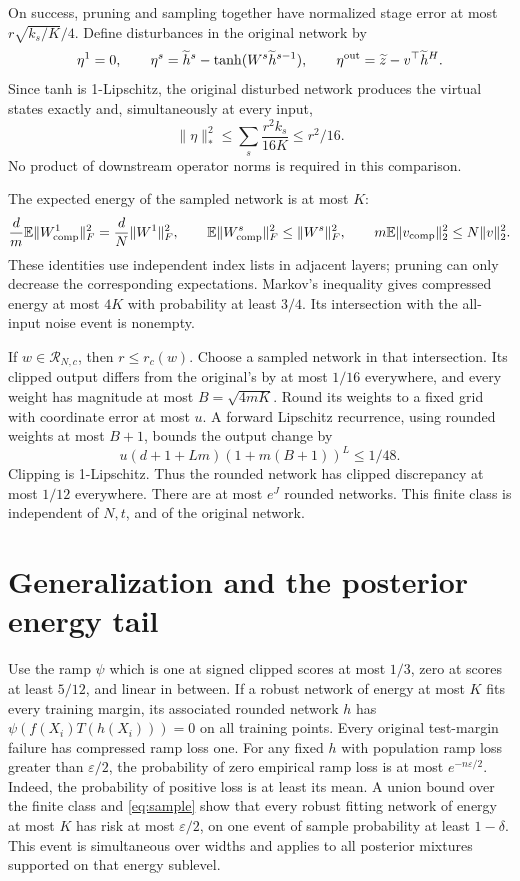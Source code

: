 \documentclass[11pt]{article}
\begin{document}
On success, pruning and sampling together have normalized stage error at
most $r\sqrt{k_s/K}/4$. Define disturbances in the original network by
\[
 \eta^1=0,\qquad
 \eta^s=\widetilde h^s-\tanh(W^s\widetilde h^{s-1}),\qquad
 \eta^{\rm out}=\widetilde z-v^\top\widetilde h^H.
\]
Since tanh is 1-Lipschitz, the original disturbed network produces the
virtual states exactly and, simultaneously at every input,
\[
 \|\eta\|_*^2\le\sum_s\frac{r^2k_s}{16K}\le r^2/16.
\]
No product of downstream operator norms is required in this comparison.

The expected energy of the sampled network is at most $K$:
\[
 \frac dm\mathbb E\|W^1_{\rm comp}\|_F^2
   =\frac dN\|W^1\|_F^2,\qquad
 \mathbb E\|W^s_{\rm comp}\|_F^2\le\|W^s\|_F^2,\qquad
 m\mathbb E\|v_{\rm comp}\|_2^2\le N\|v\|_2^2.
\]
These identities use independent index lists in adjacent layers; pruning
can only decrease the corresponding expectations. Markov's inequality
gives compressed energy at most $4K$ with probability at least $3/4$.
Its intersection with the all-input noise event is nonempty.

If $w\in\mathcal R_{N,c}$, then $r\le r_c(w)$. Choose a sampled network
in that intersection. Its clipped output differs from the original's by
at most $1/16$ everywhere, and every weight has magnitude at most
$B=\sqrt{4mK}$. Round its weights to a fixed grid with coordinate error
at most $u$. A forward Lipschitz recurrence, using rounded weights at
most $B+1$, bounds the output change by
\[
 u(d+1+Lm)(1+m(B+1))^L\le1/48.
\]
Clipping is 1-Lipschitz. Thus the rounded network has clipped discrepancy
at most $1/12$ everywhere. There are at most $e^J$ rounded networks.
This finite class is independent of $N,t$, and of the original network.

\section{Generalization and the posterior energy tail}
Use the ramp $\psi$ which is one at signed clipped scores at most $1/3$,
zero at scores at least $5/12$, and linear in between. If a robust network
of energy at most $K$ fits every training margin, its associated rounded
network $h$ has $\psi(f(X_i)T(h(X_i)))=0$ on all training points.
Every original test-margin failure has compressed ramp loss one.
For any fixed $h$ with population ramp loss greater than
$\varepsilon/2$, the probability of zero empirical ramp loss is at most
$e^{-n\varepsilon/2}$. Indeed, the probability of positive loss is at least
its mean. A union bound over the finite class and \eqref{eq:sample} show
that every robust fitting network of energy at most $K$ has risk at most
$\varepsilon/2$, on one event of sample probability at least $1-\delta$.
This event is simultaneous over widths and applies to all posterior
mixtures supported on that energy sublevel.
\end{document}
